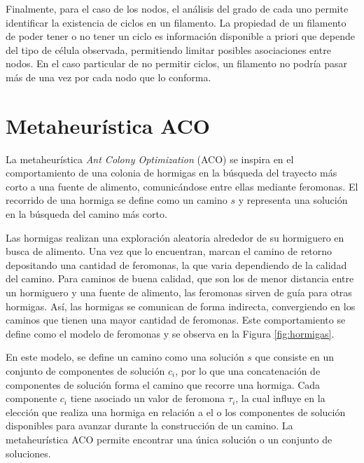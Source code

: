 Finalmente, para el caso de los nodos, el an\'alisis del grado de cada uno permite identificar la existencia de ciclos \cite{wilson1979introduction} en un filamento. La propiedad de un filamento de poder tener o no tener un ciclo es informaci\'on disponible a priori que depende del tipo de c\'elula observada, permitiendo limitar posibles asociaciones entre nodos. En el caso particular de no permitir ciclos, un filamento no podr\'ia pasar m\'as de una vez por cada nodo que lo conforma. 

\section{Metaheur\'istica ACO}
\label{sec:hormigas}
La metaheur\'istica {\it Ant Colony Optimization} (ACO) se inspira en el comportamiento de una colonia de hormigas en la b\'usqueda del trayecto m\'as corto a una fuente de alimento, comunic\'andose entre ellas mediante feromonas. El recorrido de una hormiga se define como un camino $s$ y representa una soluci\'on en la b\'usqueda del camino m\'as corto.

Las hormigas realizan una exploraci\'on aleatoria alrededor de su hormiguero en busca de alimento. Una vez que lo encuentran, marcan el camino de retorno depositando una cantidad de feromonas, la que varia dependiendo de la calidad del camino. Para caminos de buena calidad, que son los de menor distancia entre un hormiguero y una fuente de alimento, las feromonas sirven de guía para otras hormigas. As\'i, las hormigas se comunican de forma indirecta, convergiendo en los caminos que tienen una mayor cantidad de feromonas. Este comportamiento se define como el modelo de feromonas y se observa en la Figura \ref{fig:hormigas}.


En este modelo, se define un camino como una soluci\'on $s$ que consiste en un conjunto de componentes de soluci\'on $c_{i}$, por lo que una concatenaci\'on de componentes de soluci\'on forma el camino que recorre una hormiga. Cada componente $c_{i}$ tiene asociado un valor de feromona $\tau_i$, la cual influye en la elecci\'on que realiza una hormiga en relaci\'on a el o los componentes de soluci\'on disponibles para avanzar durante la construcci\'on de un camino. La metaheur\'istica ACO permite encontrar una \'unica soluci\'on o un conjunto de soluciones. 


